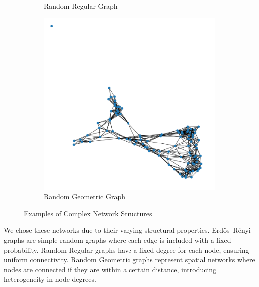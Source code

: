 \begin{figure}[H]
\begin{subfigure}{0.33\textwidth}
        \caption{Random Regular Graph}
        \label{fig:random_regular_graph}
    \end{subfigure}
    \begin{subfigure}{0.33\textwidth}
        \centering
        \includegraphics[width=\textwidth]{random_geometric_graph.png}
        \caption{Random Geometric Graph}
        \label{fig:random_geometric_graph}
    \end{subfigure}
    \caption{Examples of Complex Network Structures}
    \label{fig:network_types}
\end{figure}

We chose these networks due to their varying structural properties. Erdős–Rényi graphs are simple random graphs where each edge is included with a fixed probability. Random Regular graphs have a fixed degree for each node, ensuring uniform connectivity. Random Geometric graphs represent spatial networks where nodes are connected if they are within a certain distance, introducing heterogeneity in node degrees.\\


